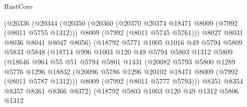 \begin{lexlean}{RustCore}
\begin{coremodule}
                      (@20336
                        (@20344
                          (@20350
                            (@20360
                              (@20370 @20374 @18471 @8009 (@7992 (@8011 @5755 @1312)))
                              @8009
                              (@7992 (@8011 @5745 @5761)))
                            @8027
                            @8031
                            @8036
                            @8041
                            @8047
                            @8056)
                          (@18792
                            @5771
                            @1005
                            @1016
                            @49
                            @5794
                            @5809
                            @5833
                            @5848
                            (@18714
                              @996
                              @1003
                              @120
                              @49
                              @5794
                              @5803
                              @1312
                              @5809
                              (@18646
                                @964
                                @55
                                @51
                                @5794
                                @5801
                                @1431
                                (@20082
                                  @5793
                                  @5800
                                  @1289
                                  @5776
                                  @1296
                                  @18832
                                  (@20096
                                    @5786
                                    @1296
                                    @20102
                                    @18471
                                    @8009
                                    (@7992 (@8011 @5787 @1312)))
                                  @8009
                                  (@7992 (@8011 @5777 @5793)))
                                @8351
                                @8354
                                @8357
                                @8361
                                @8366
                                @8372)
                              (@18792
                                @5803
                                @1003
                                @120
                                @49
                                @1312
                                @5806
                                @1312

\end{coremodule}
\end{lexlean}
